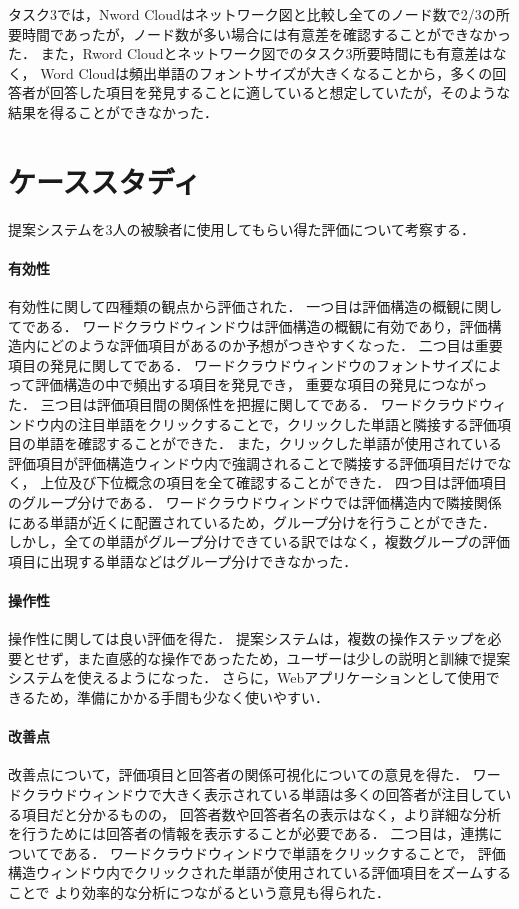 \documentclass[syuuron]{kuee}
\begin{document}
	タスク3では，Nword Cloudはネットワーク図と比較し全てのノード数で2/3の所要時間であったが，ノード数が多い場合には有意差を確認することができなかった．
	また，Rword Cloudとネットワーク図でのタスク3所要時間にも有意差はなく，
	Word Cloudは頻出単語のフォントサイズが大きくなることから，多くの回答者が回答した項目を発見することに適していると想定していたが，そのような結果を得ることができなかった．
	
	\section{ケーススタディ}%
	提案システムを3人の被験者に使用してもらい得た評価について考察する．
		\paragraph{有効性}
		有効性に関して四種類の観点から評価された．
		一つ目は評価構造の概観に関してである．
		ワードクラウドウィンドウは評価構造の概観に有効であり，評価構造内にどのような評価項目があるのか予想がつきやすくなった．
		二つ目は重要項目の発見に関してである．
		ワードクラウドウィンドウのフォントサイズによって評価構造の中で頻出する項目を発見でき，
		重要な項目の発見につながった．
		三つ目は評価項目間の関係性を把握に関してである．
		ワードクラウドウィンドウ内の注目単語をクリックすることで，クリックした単語と隣接する評価項目の単語を確認することができた．
		また，クリックした単語が使用されている評価項目が評価構造ウィンドウ内で強調されることで隣接する評価項目だけでなく，
		上位及び下位概念の項目を全て確認することができた．
		四つ目は評価項目のグループ分けである．
		ワードクラウドウィンドウでは評価構造内で隣接関係にある単語が近くに配置されているため，グループ分けを行うことができた．
		しかし，全ての単語がグループ分けできている訳ではなく，複数グループの評価項目に出現する単語などはグループ分けできなかった．
		
		\paragraph{操作性}
		操作性に関しては良い評価を得た．
		提案システムは，複数の操作ステップを必要とせず，また直感的な操作であったため，ユーザーは少しの説明と訓練で提案システムを使えるようになった．
		さらに，Webアプリケーションとして使用できるため，準備にかかる手間も少なく使いやすい．
		
		\paragraph{改善点}
		改善点について，評価項目と回答者の関係可視化についての意見を得た．
		ワードクラウドウィンドウで大きく表示されている単語は多くの回答者が注目している項目だと分かるものの，
		回答者数や回答者名の表示はなく，より詳細な分析を行うためには回答者の情報を表示することが必要である．
		二つ目は，連携についてである．
		ワードクラウドウィンドウで単語をクリックすることで，
		評価構造ウィンドウ内でクリックされた単語が使用されている評価項目をズームすることで
		より効率的な分析につながるという意見も得られた．
		
\end{document}
